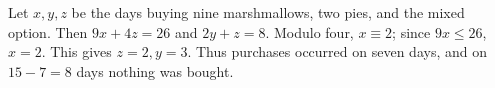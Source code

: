 Let $x,y,z$ be the days buying nine marshmallows, two pies, and the mixed option. Then $9x+4z=26$ and $2y+z=8$. Modulo four, $x\equiv2$; since $9x\le26$, $x=2$. This gives $z=2,y=3$. Thus purchases occurred on seven days, and on $15-7=\boxed8$ days nothing was bought.
